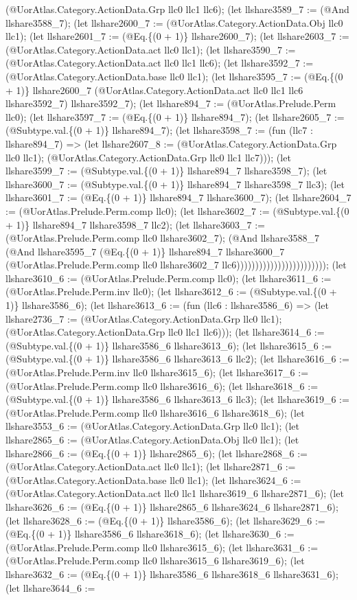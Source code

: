 \documentclass[11pt]{article}
\begin{document}
(@UorAtlas.Category.ActionData.Grp llc0 llc1 llc6); (let llshare3589\_7 := (@And llshare3588\_7); (let llshare2600\_7 := (@UorAtlas.Category.ActionData.Obj llc0 llc1); (let llshare2601\_7 := (@Eq.\{(0 + 1)\} llshare2600\_7); (let llshare2603\_7 := (@UorAtlas.Category.ActionData.act llc0 llc1); (let llshare3590\_7 := (@UorAtlas.Category.ActionData.act llc0 llc1 llc6); (let llshare3592\_7 := (@UorAtlas.Category.ActionData.base llc0 llc1); (let llshare3595\_7 := (@Eq.\{(0 + 1)\} llshare2600\_7 (@UorAtlas.Category.ActionData.act llc0 llc1 llc6 llshare3592\_7) llshare3592\_7); (let llshare894\_7 := (@UorAtlas.Prelude.Perm llc0); (let llshare3597\_7 := (@Eq.\{(0 + 1)\} llshare894\_7); (let llshare2605\_7 := (@Subtype.val.\{(0 + 1)\} llshare894\_7); (let llshare3598\_7 := (fun (llc7 : llshare894\_7) => (let llshare2607\_8 := (@UorAtlas.Category.ActionData.Grp llc0 llc1); (@UorAtlas.Category.ActionData.Grp llc0 llc1 llc7))); (let llshare3599\_7 := (@Subtype.val.\{(0 + 1)\} llshare894\_7 llshare3598\_7); (let llshare3600\_7 := (@Subtype.val.\{(0 + 1)\} llshare894\_7 llshare3598\_7 llc3); (let llshare3601\_7 := (@Eq.\{(0 + 1)\} llshare894\_7 llshare3600\_7); (let llshare2604\_7 := (@UorAtlas.Prelude.Perm.comp llc0); (let llshare3602\_7 := (@Subtype.val.\{(0 + 1)\} llshare894\_7 llshare3598\_7 llc2); (let llshare3603\_7 := (@UorAtlas.Prelude.Perm.comp llc0 llshare3602\_7); (@And llshare3588\_7 (@And llshare3595\_7 (@Eq.\{(0 + 1)\} llshare894\_7 llshare3600\_7 (@UorAtlas.Prelude.Perm.comp llc0 llshare3602\_7 llc6)))))))))))))))))))))))); (let llshare3610\_6 := (@UorAtlas.Prelude.Perm.comp llc0); (let llshare3611\_6 := (@UorAtlas.Prelude.Perm.inv llc0); (let llshare3612\_6 := (@Subtype.val.\{(0 + 1)\} llshare3586\_6); (let llshare3613\_6 := (fun (llc6 : llshare3586\_6) => (let llshare2736\_7 := (@UorAtlas.Category.ActionData.Grp llc0 llc1); (@UorAtlas.Category.ActionData.Grp llc0 llc1 llc6))); (let llshare3614\_6 := (@Subtype.val.\{(0 + 1)\} llshare3586\_6 llshare3613\_6); (let llshare3615\_6 := (@Subtype.val.\{(0 + 1)\} llshare3586\_6 llshare3613\_6 llc2); (let llshare3616\_6 := (@UorAtlas.Prelude.Perm.inv llc0 llshare3615\_6); (let llshare3617\_6 := (@UorAtlas.Prelude.Perm.comp llc0 llshare3616\_6); (let llshare3618\_6 := (@Subtype.val.\{(0 + 1)\} llshare3586\_6 llshare3613\_6 llc3); (let llshare3619\_6 := (@UorAtlas.Prelude.Perm.comp llc0 llshare3616\_6 llshare3618\_6); (let llshare3553\_6 := (@UorAtlas.Category.ActionData.Grp llc0 llc1); (let llshare2865\_6 := (@UorAtlas.Category.ActionData.Obj llc0 llc1); (let llshare2866\_6 := (@Eq.\{(0 + 1)\} llshare2865\_6); (let llshare2868\_6 := (@UorAtlas.Category.ActionData.act llc0 llc1); (let llshare2871\_6 := (@UorAtlas.Category.ActionData.base llc0 llc1); (let llshare3624\_6 := (@UorAtlas.Category.ActionData.act llc0 llc1 llshare3619\_6 llshare2871\_6); (let llshare3626\_6 := (@Eq.\{(0 + 1)\} llshare2865\_6 llshare3624\_6 llshare2871\_6); (let llshare3628\_6 := (@Eq.\{(0 + 1)\} llshare3586\_6); (let llshare3629\_6 := (@Eq.\{(0 + 1)\} llshare3586\_6 llshare3618\_6); (let llshare3630\_6 := (@UorAtlas.Prelude.Perm.comp llc0 llshare3615\_6); (let llshare3631\_6 := (@UorAtlas.Prelude.Perm.comp llc0 llshare3615\_6 llshare3619\_6); (let llshare3632\_6 := (@Eq.\{(0 + 1)\} llshare3586\_6 llshare3618\_6 llshare3631\_6); (let llshare3644\_6 := 
\end{document}
